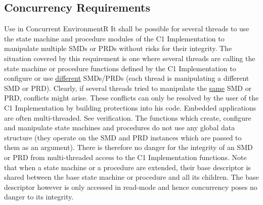 \documentclass[a4paper,10pt]{article}
\newenvironment{fw_req_note}[7]
{\addtocounter{subsubsection}{1}
	\hspace{0.2cm}\textbf{FW-\arabic{section}.\arabic{subsection}.\arabic{subsubsection}/#2
	\hspace{0.8cm} #1}
	\vspace{-10pt}
\begin{longtable}{p{2.7cm}P{8.5cm}}
\hline
\textsc{Requirement} & #3 \\
\textsc{Note} & #4 \\
\textsc{Justification} & #5 \\
\textsc{Implementation} & #6  \\ 
\textsc{Verification} & #7  \\
\hline
}
{\end{longtable}}
\begin{document}
\subsection{Concurrency Requirements}\label{req:concurrencyReqs}

\begin{fw_req_note}{Use in Concurrent Environment}{R}
{It shall be possible for several threads to use the state machine and procedure modules of the C1 Implementation to manipulate multiple SMDs or PRDs without risks for their integrity.}
{The situation covered by this requirement is one where several threads are calling the state machine or procedure functions defined by the C1 Implementation to configure or use \underline{different} SMDs/PRDs (each thread is manipulating a different SMD or PRD). Clearly, if several threads tried to manipulate the \underline{same} SMD or PRD, conflicts might arise. These conflicts can only be resolved by the user of the C1 Implementation by building protections into his code.
}
{Embedded applications are often multi-threaded.}
{See verification.} 
{The functions which create, configure and manipulate state machines 
and procedures do not use any global data structure (they operate on 
the SMD and PRD instances which are passed to them as an argument). 
There is therefore no danger for the integrity of an SMD or PRD from multi-threaded access to 
the C1 Implementation functions. 
Note that when a state machine or a procedure are extended, their base descriptor is shared
between the base state machine or procedure and all its children.
The base descriptor however is only accessed in read-mode and hence concurrency poses
no danger to its integrity.}
\end{fw_req_note}
\end{document}
